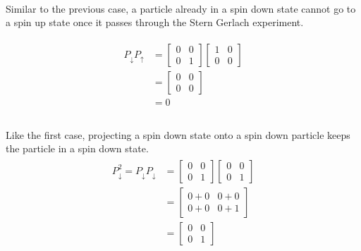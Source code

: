 \documentclass{article}
\begin{document}
\paragraph[short]{} {
    Similar to the previous case, a particle already in a spin down state cannot go to a spin up state once it passes through the Stern Gerlach experiment.
}

\begin{align*}
    \begin{split}
        P_\downarrow P_\uparrow &=
        \begin{bmatrix}
            0 & 0 \\
            0 & 1
        \end{bmatrix}
        \begin{bmatrix}
            1 & 0 \\
            0 & 0
        \end{bmatrix} \\
        &=
        \begin{bmatrix}
            0 & 0 \\
            0 & 0
        \end{bmatrix} \\
         &= 0 \\
    \end{split}
\end{align*}

\paragraph[short]{} {
    Like the first case, projecting a spin down state onto a spin down particle keeps the particle in a spin down state.
}
\begin{align*}
    \begin{split}
        P_\downarrow^2 = P_\downarrow P_\downarrow &=
        \begin{bmatrix}
            0 & 0 \\
            0 & 1
        \end{bmatrix}
        \begin{bmatrix}
            0 & 0 \\
            0 & 1
        \end{bmatrix} \\
        &=
        \begin{bmatrix}
            0 + 0 & 0 + 0 \\
            0 + 0 & 0 + 1
        \end{bmatrix} \\
        &=
        \begin{bmatrix}
            0 & 0 \\
            0 & 1
        \end{bmatrix}
    \end{split}
\end{align*}
\end{document}
